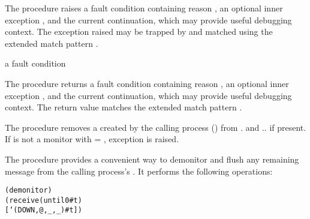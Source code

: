 The  procedure raises a fault condition containing reason
, an optional inner exception , and the current
continuation, which may provide useful debugging context.
The exception raised may be trapped by  and matched using
the extended match pattern .

\begin{procedure}
\end{procedure}
\returns{} a fault condition

The  procedure returns a fault condition containing reason
, an optional inner exception , and the current
continuation, which may provide useful debugging context.
The return value matches
the extended match pattern .

\begin{procedure}
\end{procedure}
\returns{} 

The  procedure removes a  created by
the calling process () from . and
.. if present.  If
 is not a monitor with  = ,
exception  is raised.

\begin{procedure}
\end{procedure}
\returns{} 

The  procedure provides a convenient way to
demonitor and flush any remaining  message from the
calling process's . It performs the following operations:
\antipar\begin{alltt}
(demonitor )
(receive (until 0 #t)
  [`(DOWN ,@ ,_ ,_) #t])
\end{alltt}

\begin{procedure}
\end{procedure}
\returns{} 

